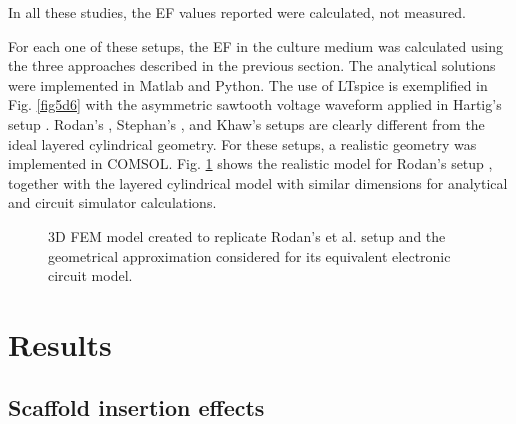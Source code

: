 \noindent In all these studies, the \acs{EF} values reported were calculated, not measured.

For each one of these setups, the \acs{EF} in the culture medium was calculated using the three approaches described in the previous section. The analytical solutions were implemented in Matlab and Python. The use of LTspice is exemplified in Fig. \ref{fig5d6} with the asymmetric sawtooth voltage waveform applied in Hartig's setup \cite{Hartig2000-ny}. Rodan’s \cite{Rodan1978-yu}, Stephan's \cite{Stephan2020-qh}, and Khaw's \cite{Khaw2021-tv} setups are clearly different from the ideal layered cylindrical geometry. For these setups, a realistic geometry was implemented in COMSOL. Fig. \ref{fig5d7} shows the realistic model for Rodan's setup \cite{Rodan1978-yu}, together with the layered cylindrical model with similar dimensions for analytical and circuit simulator calculations.


\begin{figure}
\caption{\acs{3D} \acs{FEM} model created to replicate Rodan's et al. setup \cite{Rodan1978-yu} and the geometrical approximation considered for its equivalent electronic circuit model.}
\label{fig5d7}
\end{figure}




\section{Results}




\subsection{Scaffold insertion effects}


